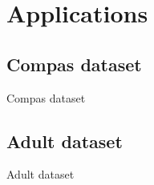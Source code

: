 \section{Applications}

\subsection{Compas dataset}
\begin{frame}{Compas dataset}
\end{frame}

\subsection{Adult dataset}
\begin{frame}{Adult dataset}
\end{frame}